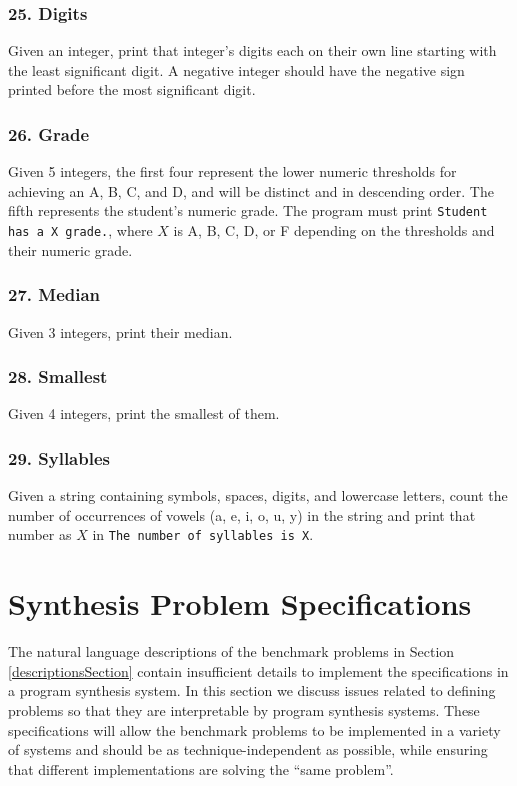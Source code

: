 \documentclass{sig-alternate}
\begin{document}
\subsubsection*{25. Digits}
Given an integer, print that integer's digits each on their own line starting with the least significant digit. A negative integer should have the negative sign printed before the most significant digit.

\subsubsection*{26. Grade}
Given 5 integers, the first four represent the lower numeric thresholds for achieving an A, B, C, and D, and will be distinct and in descending order. The fifth represents the student's numeric grade. The program must print \texttt{Student has a X grade.}, where $X$ is A, B, C, D, or F depending on the thresholds and their numeric grade.

\subsubsection*{27. Median}
Given 3 integers, print their median.

\subsubsection*{28. Smallest}
Given 4 integers, print the smallest of them.

\subsubsection*{29. Syllables}
Given a string containing symbols, spaces, digits, and lowercase letters, count the number of occurrences of vowels (a, e, i, o, u, y) in the string and print that number as $X$ in \texttt{The number of syllables is X}.

\section{Synthesis Problem Specifications}

The natural language descriptions of the benchmark problems in Section \ref{descriptionsSection} contain insufficient details to implement the specifications in a program synthesis system. In this section we discuss issues related to defining problems so that they are interpretable by program synthesis systems. These specifications will allow the benchmark problems to be implemented in a variety of systems and should be as technique-independent as possible, while ensuring that different implementations are solving the ``same problem''.
\end{document}
